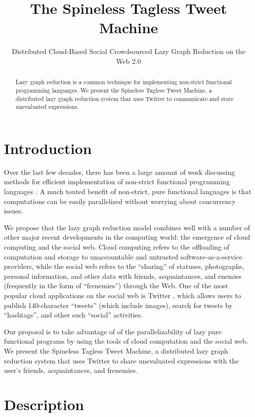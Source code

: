\documentclass{sigplanconf}
\title{The Spineless Tagless Tweet Machine}
\subtitle{Distributed Cloud-Based Social Crowdsourced Lazy Graph Reduction on the Web 2.0}
\begin{document}
\maketitle

\begin{abstract}
Lazy graph reduction is a common technique for implementing non-strict
functional programming languages.
We present the Spineless Tagless Tweet Machine, a distributed lazy
graph reduction system that uses Twitter to communicate and store
unevaluated expressions.
\end{abstract}

\section{Introduction}
Over the last few decades, there has been a large amount of work
discussing methods for efficient implementation of non-strict
functional programming languages \cite{Jones92implementinglazy}
\cite{Naylor:2010:RR:1932681.1863556}. 
A much touted benefit of non-strict, pure functional languages is that
computations can be easily parallelized without worrying about
concurrency issues.

We propose that the lazy graph reduction model combines well with a
number of other major recent developments in the computing world: the
emergence of cloud computing and the social web. Cloud computing
refers to the offloading of computation and storage to unaccountable
and untrusted software-as-a-service providers, while the social web
refers to the ``sharing'' of statuses, photographs, personal
information, and other data with friends, acquaintances, and enemies
(frequently in the form of ``frenemies'') through the Web.  One of the
most popular cloud applications on the social web is Twitter
\cite{twitter}, which allows users to publish 140-character ``tweets''
(which include images), search for tweets by ``hashtags'', and other
such ``social'' activities.

Our proposal is to take advantage of of the parallelizability of lazy
pure functional programs by using the tools of cloud computation and
the social web.  We present the Spineless Tagless Tweet Machine, a
distributed lazy graph reduction system that uses Twitter to share
unevaluated expressions with the user's friends, acquaintances, and
frenemies.

\section{Description}
\end{document}
